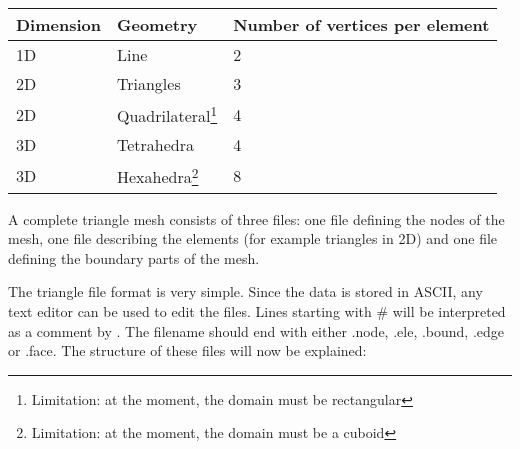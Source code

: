 \begin{tabular}{ l l l }
\textbf{Dimension} & \textbf{Geometry} & \textbf{Number of vertices per element} \\ \hline
1D & Line & 2\\ 
2D & Triangles &  3 \\ 
2D & Quadrilateral\footnote{Limitation: at the moment, the domain must be rectangular} & 4 \\
3D & Tetrahedra & 4 \\ 
3D & Hexahedra\footnote{Limitation: at the moment, the domain must be a cuboid} & 8 \\
\end{tabular}

A complete triangle mesh consists of three files: one file defining the
nodes of the mesh, one file describing the elements (for example triangles
in 2D) and one file defining the boundary parts of the mesh.

The triangle file format is very simple. Since the data is stored in ASCII,
any text editor can be used to edit the files.  Lines starting with \# will
be interpreted as a comment by \fluidity.  The filename should end with
either .node, .ele, .bound, .edge or .face.  The structure of these files
will now be explained:

